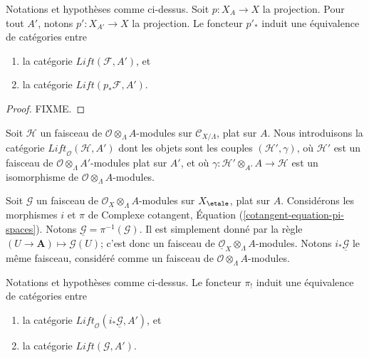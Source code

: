 \begin{lemma}
\label{lemma-equivalence}
Notations et hypoth\`eses comme ci-dessus. Soit $p : X_A \to X$ la projection.
Pour tout $A'$, notons $p' : X_{A'} \to X$ la projection. Le foncteur $p'_*$
induit une \'equivalence de cat\'egories entre
\begin{enumerate}
\item la cat\'egorie $\textit{Lift}(\mathcal{F}, A')$, et
\item la cat\'egorie $\textit{Lift}(p_*\mathcal{F}, A')$.
\end{enumerate}
\end{lemma}

\begin{proof}
FIXME.
\end{proof}

\noindent
Soit $\mathcal{H}$ un faisceau de $\mathcal{O} \otimes_\Lambda A$-modules
sur $\mathcal{C}_{X/\Lambda}$, plat sur $A$. Nous introduisons la cat\'egorie
$\textit{Lift}_\mathcal{O}(\mathcal{H}, A')$
dont les objets sont les couples $(\mathcal{H}', \gamma)$, o\`u $\mathcal{H}'$
est un faisceau de $\mathcal{O} \otimes_\Lambda A'$-modules plat sur $A'$,
et o\`u $\gamma : \mathcal{H}' \otimes_{A'} A \to \mathcal{H}$
est un isomorphisme de $\mathcal{O} \otimes_\Lambda A$-modules.

\medskip\noindent
Soit $\mathcal{G}$ un faisceau de $\mathcal{O}_X \otimes_\Lambda A$-modules
sur $X_\etale$, plat sur $A$.
Consid\'erons les morphismes $i$ et $\pi$ de
Complexe cotangent, \'Equation (\ref{cotangent-equation-pi-spaces}).
Notons $\underline{\mathcal{G}} = \pi^{-1}(\mathcal{G})$. Il est
simplement donn\'e par la r\`egle $(U \to \mathbf{A}) \mapsto \mathcal{G}(U)$;
c'est donc un faisceau de
$\underline{\mathcal{O}}_X \otimes_\Lambda A$-modules.
Notons $i_*\underline{\mathcal{G}}$ le m\^eme faisceau, consid\'er\'e comme un
faisceau de $\mathcal{O} \otimes_\Lambda A$-modules.

\begin{lemma}
\label{lemma-second-equivalence}
Notations et hypoth\`eses comme ci-dessus.
Le foncteur $\pi_!$ induit une \'equivalence de cat\'egories entre
\begin{enumerate}
\item la cat\'egorie
$\textit{Lift}_\mathcal{O}(i_*\underline{\mathcal{G}}, A')$, et
\item la cat\'egorie $\textit{Lift}(\mathcal{G}, A')$.
\end{enumerate}
\end{lemma}

